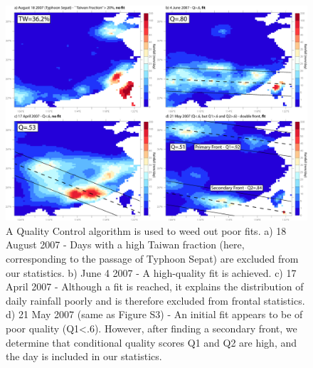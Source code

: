 \documentclass[draft,grl]{agutexSI}
\begin{document}
\begin{article}
\begin{figure}
\noindent\includegraphics[width=36pc]{Figures/S4}
\caption{A Quality Control algorithm is used to weed out poor fits. a) 18 August 2007 - Days with a high Taiwan fraction (here, corresponding to the passage of Typhoon Sepat) are excluded from our statistics. b) June 4 2007 - A high-quality fit is achieved. c) 17 April 2007 - Although a fit is reached, it explains the distribution of daily rainfall poorly and is therefore excluded from frontal statistics. d) 21 May 2007 (same as Figure S3) - An initial fit appears to be of poor quality (Q1<.6). However, after finding a secondary front, we determine that conditional quality scores Q1 and Q2 are high, and the day is included in our statistics.}
\end{figure}

\end{article}
\end{document}
